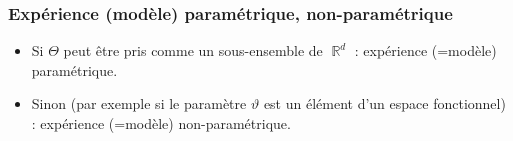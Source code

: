 ﻿\documentclass{beamer}
\DeclareMathOperator{\R}{{\mathbb R}}
\DeclareMathOperator{\PP}{{\mathbb P}}
\begin{document}

\begin{frame}
\frametitle{Expérience (mod\`ele) paramétrique, non-paramétrique}
\begin{itemize}
\item Si $\Theta$ peut être \og pris \fg{} comme un sous-ensemble
de $\R^d$ : {\color{red} expérience (=mod\`ele) paramétrique}.
\item Sinon (par exemple si le paramètre $\vartheta$ est un élément d'un espace fonctionnel) : {\color{red} expérience (=mod\`ele) non-paramétrique}.
\end{itemize}
\end{frame}
\end{document}
